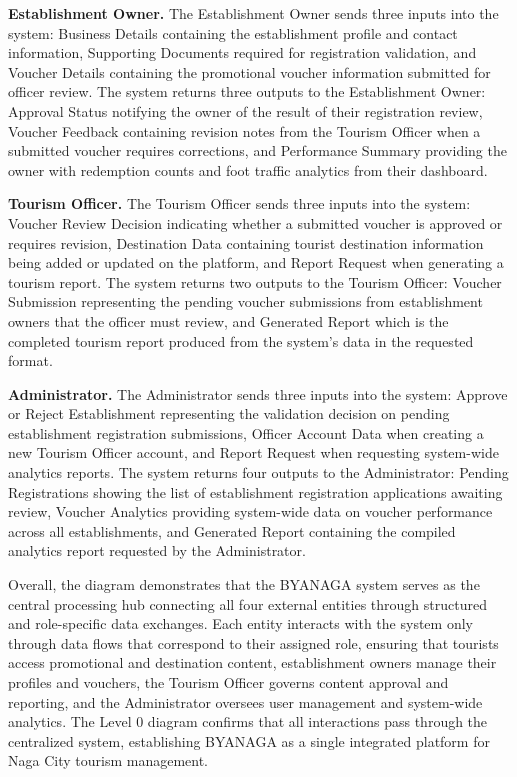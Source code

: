 \documentclass{research}
\begin{document}
\textbf{Establishment Owner.}
The Establishment Owner sends three inputs into the system: Business Details
containing the establishment profile and contact information, Supporting
Documents required for registration validation, and Voucher Details containing
the promotional voucher information submitted for officer review. The system
returns three outputs to the Establishment Owner: Approval Status notifying
the owner of the result of their registration review, Voucher Feedback
containing revision notes from the Tourism Officer when a submitted voucher
requires corrections, and Performance Summary providing the owner with
redemption counts and foot traffic analytics from their dashboard.

\textbf{Tourism Officer.}
The Tourism Officer sends three inputs into the system: Voucher Review
Decision indicating whether a submitted voucher is approved or requires
revision, Destination Data containing tourist destination information being
added or updated on the platform, and Report Request when generating a tourism
report. The system returns two outputs to the Tourism Officer: Voucher
Submission representing the pending voucher submissions from establishment
owners that the officer must review, and Generated Report which is the
completed tourism report produced from the system's data in the requested
format.

\textbf{Administrator.}
The Administrator sends three inputs into the system: Approve or Reject
Establishment representing the validation decision on pending establishment
registration submissions, Officer Account Data when creating a new Tourism
Officer account, and Report Request when requesting system-wide analytics
reports. The system returns four outputs to the Administrator: Pending
Registrations showing the list of establishment registration applications
awaiting review, Voucher Analytics providing system-wide data on voucher
performance across all establishments, and Generated Report containing the
compiled analytics report requested by the Administrator.

Overall, the diagram demonstrates that the BYANAGA system serves as the
central processing hub connecting all four external entities through structured
and role-specific data exchanges. Each entity interacts with the system only
through data flows that correspond to their assigned role, ensuring that
tourists access promotional and destination content, establishment owners
manage their profiles and vouchers, the Tourism Officer governs content
approval and reporting, and the Administrator oversees user management and
system-wide analytics. The Level 0 diagram confirms that all interactions pass
through the centralized system, establishing BYANAGA as a single integrated
platform for Naga City tourism management.
\end{document}
